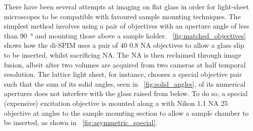 There have been several attempts at imaging on flat glass in order for light-sheet microscopes to be compatible with favoured sample mounting techniques.
The simplest method involves using a pair of objectives with an aperture angle of less than \SI{90}{\degree} and mounting those above a sample holder.
\figurename~\ref{fig:matched_objectives} shows how the di-SPIM\cite{1} uses a pair of \SI{40}{\times} 0.8 \gls{NA} objectives to allow a glass slip to be inserted, whilst sacrificing \gls{NA}.
The \gls{NA} is then reclaimed through image fusion, albeit after two volumes are acquired from two cameras at half temporal resolution.
The lattice light sheet\cite{2}, for instance, chooses a special objective pair such that the sum of its solid angles, seen in \figurename~\ref{fig:solid_angles}, of its numerical apertures does not interfere with the glass raised from below.
To do so, a special (expensive) excitation objective is mounted along a with Nikon 1.1 NA \SI{25}{\times} objective at angles to the sample mounting section to allow a sample chamber to be inserted, as shown in \figurename~\ref{fig:asymmetric_special}.


